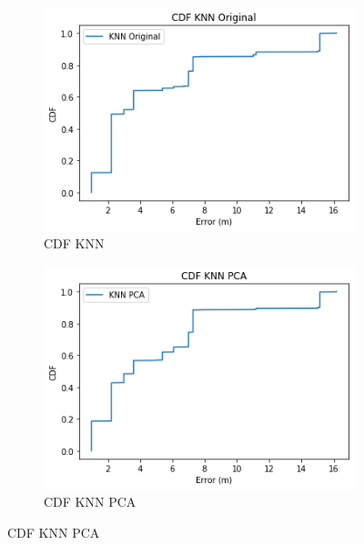 \begin{figure}[ht!]
\centering
\begin{subfigure}{.5\textwidth}
  \centering
  \includegraphics[width=.8\linewidth]{figures/cdf-knn-estatico.png}
  \caption{CDF KNN}
  \label{fig:sub1}
\end{subfigure}%
\begin{subfigure}{.5\textwidth}
  \centering
  \includegraphics[width=.8\linewidth]{figures/cdf-knnPCA-estatico.png}
  \caption{CDF KNN PCA}
  \label{fig:sub2}
\end{subfigure}


\end{figure}
